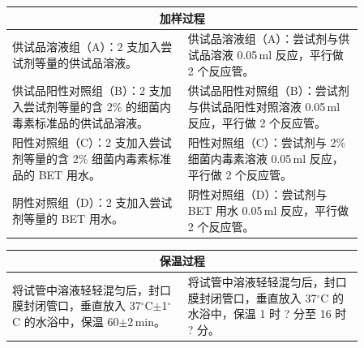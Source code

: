 \documentclass[UTF8,10pt,a4paper,fontset=fandol]{ctexart}
\newcommand{\fieldvalue}[1]{#1}
\newcommand{\handwritten}[1]{#1}
\begin{document}
\begin{center}
\begin{tabular}{|p{0.43\linewidth}|p{0.43\linewidth}|}
\hline
\multicolumn{2}{|c|}{加样过程}\\
\hline
供试品溶液组（A）：2 支加入尝试剂等量的供试品溶液。
&
供试品溶液组（A）：尝试剂与供试品溶液
\fieldvalue{\handwritten{0.05}}\,ml 反应，平行做
\fieldvalue{\handwritten{2}} 个反应管。
\\
\hline
供试品阳性对照组（B）：2 支加入尝试剂等量的含 2\% 的细菌内毒素标准品的供试品溶液。
&
供试品阳性对照组（B）：尝试剂与供试品阳性对照溶液
\fieldvalue{\handwritten{0.05}}\,ml 反应，平行做
\fieldvalue{\handwritten{2}} 个反应管。
\\
\hline
阳性对照组（C）：2 支加入尝试剂等量的含 2\% 细菌内毒素标准品的 BET 用水。
&
阳性对照组（C）：尝试剂与 2\% 细菌内毒素溶液
\fieldvalue{\handwritten{0.05}}\,ml 反应，平行做
\fieldvalue{\handwritten{2}} 个反应管。
\\
\hline
阴性对照组（D）：2 支加入尝试剂等量的 BET 用水。
&
阴性对照组（D）：尝试剂与 BET 用水
\fieldvalue{\handwritten{0.05}}\,ml 反应，平行做
\fieldvalue{\handwritten{2}} 个反应管。
\\
\hline
\end{tabular}
\end{center}

\begin{center}
\begin{tabular}{|p{0.43\linewidth}|p{0.43\linewidth}|}
\hline
\multicolumn{2}{|c|}{保温过程}\\
\hline
将试管中溶液轻轻混匀后，封口膜封闭管口，垂直放入 37\({}^{\circ}\)C$\pm$1\({}^{\circ}\)C 的水浴中，保温 60$\pm$2\,min。
&
将试管中溶液轻轻混匀后，封口膜封闭管口，垂直放入
\fieldvalue{\handwritten{37}}\({}^{\circ}\)C 的水浴中，保温
\fieldvalue{\handwritten{1}} 时
\fieldvalue{\handwritten{?}} 分至
\fieldvalue{\handwritten{16}} 时
\fieldvalue{\handwritten{?}} 分。
\\
\hline
\end{tabular}
\end{center}
\end{document}
